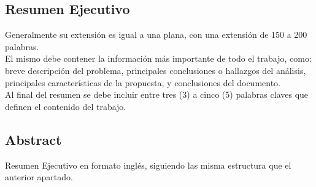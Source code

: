 \documentclass[12pt,letterpaper]{report}
\begin{document}
	\caratulaTapa
	\caratulaContenido
	\newpage
	\clearpage
	\pagestyle{empty}
	{
	
	}
	
	\newpage
	\begin{center}
	\section*{Resumen Ejecutivo}
	\end{center}
	Generalmente su extensión es igual a una plana, con una extensión de 150 a 200 palabras.\\
El mismo debe contener la información más importante de todo el trabajo, como:
breve descripción del problema, principales conclusiones o hallazgos del análisis,
principales características de la propuesta, y conclusiones del documento.\\
Al final del resumen se debe incluir entre tres (3) a cinco (5) palabras claves que
definen el contenido del trabajo.
	\thispagestyle{empty}
	\newpage
	\begin{center}
	\section*{Abstract}
	Resumen Ejecutivo en formato inglés, siguiendo las misma estructura que el anterior apartado.
	
	\end{center}
	
	\thispagestyle{empty}
	\newpage
	
	\configurarIndices
    \tableofcontents
    \thispagestyle{empty}
    \newpage
    \listoffigures
    \thispagestyle{empty}
    \newpage
    \listoftables
    \thispagestyle{empty}
    \newpage
	
\end{document}
